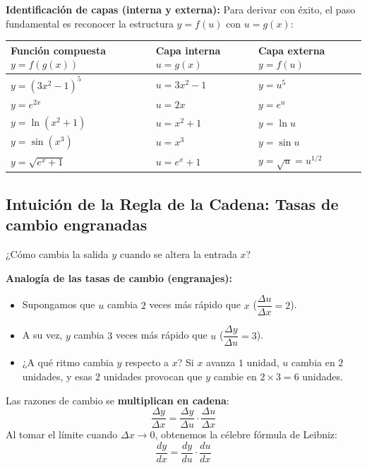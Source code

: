 \documentclass[12pt, letterpaper]{article}
\begin{document}
\textbf{Identificación de capas (interna y externa):} Para derivar con éxito, el paso fundamental es reconocer la estructura $y = f(u)$ con $u = g(x)$:
\begin{center}
  \small
  \begin{tabular}{lll}
    \toprule
    \textbf{Función compuesta $y = f(g(x))$} & \textbf{Capa interna $u = g(x)$} & \textbf{Capa externa $y = f(u)$} \\
    \midrule
    $y = (3x^2 - 1)^5$                       & $u = 3x^2 - 1$                   & $y = u^5$                        \\
    $y = e^{2x}$                             & $u = 2x$                         & $y = e^u$                        \\
    $y = \ln(x^2 + 1)$                       & $u = x^2 + 1$                    & $y = \ln u$                      \\
    $y = \sin(x^3)$                          & $u = x^3$                        & $y = \sin u$                     \\
    $y = \sqrt{e^x + 1}$                     & $u = e^x + 1$                    & $y = \sqrt{u} = u^{1/2}$         \\
    \bottomrule
  \end{tabular}
\end{center}

\newpage

\subsection{Intuición de la Regla de la Cadena: Tasas de cambio engranadas}

¿Cómo cambia la salida $y$ cuando se altera la entrada $x$?

\begin{cuadroextra}
  \textbf{Analogía de las tasas de cambio (engranajes):}
  \begin{itemize}[leftmargin=*]
    \item Supongamos que $u$ cambia $2$ veces más rápido que $x$ ($\dfrac{\Delta u}{\Delta x} = 2$).
    \item A su vez, $y$ cambia $3$ veces más rápido que $u$ ($\dfrac{\Delta y}{\Delta u} = 3$).
    \item ¿A qué ritmo cambia $y$ respecto a $x$? Si $x$ avanza $1$ unidad, $u$ cambia en $2$ unidades, y esas $2$ unidades provocan que $y$ cambie en $2 \times 3 = 6$ unidades.
  \end{itemize}
  Las razones de cambio se \textbf{multiplican en cadena}:
  $$\frac{\Delta y}{\Delta x} = \frac{\Delta y}{\Delta u} \cdot \frac{\Delta u}{\Delta x}$$
  Al tomar el límite cuando $\Delta x \to 0$, obtenemos la célebre fórmula de Leibniz:
  $$\frac{dy}{dx} = \frac{dy}{du} \cdot \frac{du}{dx}$$
\end{cuadroextra}
\end{document}
